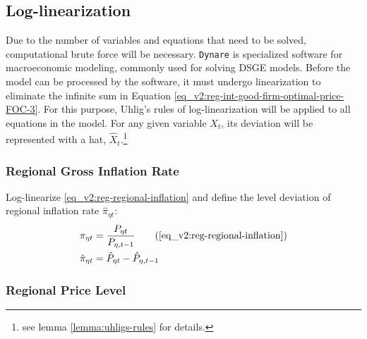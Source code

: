 \documentclass[../thesis.tex]{subfiles}
\begin{document}
	\newpage
	
	
\subsection{Log-linearization}
	
Due to the number of variables and equations that need to be solved, computational brute force will be necessary. \texttt{Dynare} is specialized software for macroeconomic modeling, commonly used for solving DSGE models. Before the model can be processed by the software, it must undergo linearization to eliminate the infinite sum in Equation \ref{eq_v2:reg-int-good-firm-optimal-price-FOC-3}. For this purpose, Uhlig's rules of log-linearization \cite{uhlig_toolkit_1999} will be applied to all equations in the model. For any given variable $X_{t}$, its deviation will be represented with a hat, $\hat{X}_{t}$.\footnote{see lemma \ref{lemma:uhligs-rules} for details.}


\subsubsection*{Regional Gross Inflation Rate}

Log-linearize \ref{eq_v2:reg-regional-inflation} and define the level deviation of regional inflation rate $\hat{\pi}_{\eta t}$:
\begin{align}
	\pi_{\eta t} &= \frac{P_{\eta t}}{P_{\eta, t-1}} \tag{\ref{eq_v2:reg-regional-inflation}} \\
	\hat{\pi}_{\eta t} &= \hat{P}_{\eta t} - \hat{P}_{\eta, t-1}
	\label{eq_v2:level-dev-regional-inflation}
\end{align}


\subsubsection*{Regional Price Level}
\end{document}
